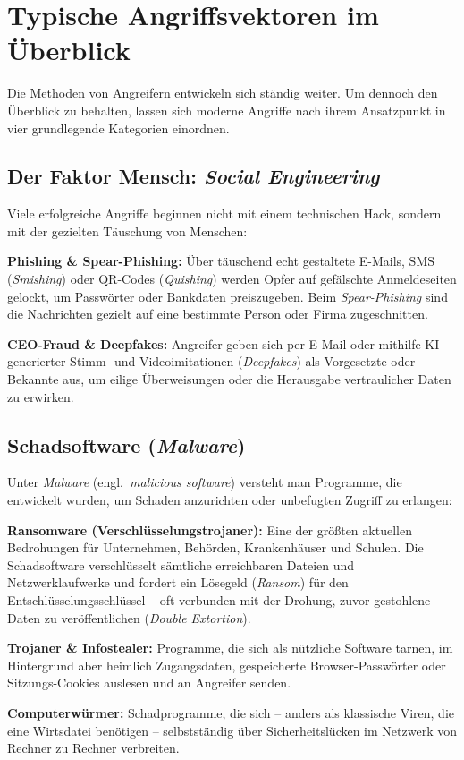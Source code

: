\section{Typische Angriffsvektoren im Überblick}

Die Methoden von Angreifern entwickeln sich ständig weiter. Um dennoch den
Überblick zu behalten, lassen sich moderne Angriffe nach ihrem Ansatzpunkt in
vier grundlegende Kategorien einordnen.

\subsection{Der Faktor Mensch: \emph{Social Engineering}}

Viele erfolgreiche Angriffe beginnen nicht mit einem technischen Hack, sondern
mit der gezielten Täuschung von Menschen:

\begin{compactitem}
\item \textbf{Phishing \& Spear-Phishing:} Über täuschend echt gestaltete
E-Mails, SMS (\emph{Smishing}) oder QR-Codes (\emph{Quishing}) werden Opfer auf
gefälschte Anmeldeseiten gelockt, um Passwörter oder Bankdaten preiszugeben.
Beim \emph{Spear-Phishing} sind die Nachrichten gezielt auf eine bestimmte
Person oder Firma zugeschnitten.
\item \textbf{CEO-Fraud \& Deepfakes:} Angreifer geben sich per E-Mail oder
mithilfe KI-generierter Stimm- und Videoimitationen (\emph{Deepfakes}) als
Vorgesetzte oder Bekannte aus, um eilige Überweisungen oder die Herausgabe
vertraulicher Daten zu erwirken.
\end{compactitem}

\subsection{Schadsoftware (\emph{Malware})}

Unter \emph{Malware} (engl.\ \emph{malicious software}) versteht man Programme,
die entwickelt wurden, um Schaden anzurichten oder unbefugten Zugriff zu
erlangen:

\begin{compactitem}
\item \textbf{Ransomware (Verschlüsselungstrojaner):} Eine der größten
aktuellen Bedrohungen für Unternehmen, Behörden, Krankenhäuser und Schulen.
Die Schadsoftware verschlüsselt sämtliche erreichbaren Dateien und
Netzwerklaufwerke und fordert ein Lösegeld (\emph{Ransom}) für den
Entschlüsselungsschlüssel -- oft verbunden mit der Drohung, zuvor gestohlene
Daten zu veröffentlichen (\emph{Double Extortion}).
\item \textbf{Trojaner \& Infostealer:} Programme, die sich als nützliche
Software tarnen, im Hintergrund aber heimlich Zugangsdaten, gespeicherte
Browser-Passwörter oder Sitzungs-Cookies auslesen und an Angreifer senden.
\item \textbf{Computerwürmer:} Schadprogramme, die sich -- anders als klassische
Viren, die eine Wirtsdatei benötigen -- selbstständig über Sicherheitslücken im
Netzwerk von Rechner zu Rechner verbreiten.
\end{compactitem}

